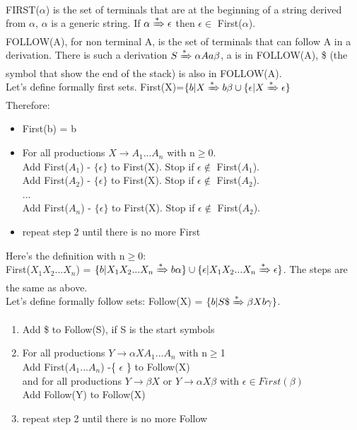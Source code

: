 \documentclass[12pt]{article}
\begin{document}
\\ FIRST($\alpha$) is the set of terminals that are at the beginning of a string derived from $\alpha$, $\alpha$ is a generic string. If $\alpha \xRightarrow[]{*} \epsilon$ then $\epsilon \in$ First($\alpha$).
\\ FOLLOW(A), for non terminal A, is the set of terminals that can follow A in a derivation. There is such a derivation $S \xRightarrow[]{*} \alpha A a \beta$, a is in FOLLOW(A), \$ (the symbol that show the end of the stack) is also in FOLLOW(A).
\vspace{2mm} 
\\ Let's define formally first sets. 
First(X)=$\{ b | X \xRightarrow[]{*} b\beta \cup \{ \epsilon | X \xRightarrow[]{*} \epsilon \}$
\\ Therefore: 
\begin{itemize}
    \item First(b) = { b }
    \item For all productions $X \rightarrow A_1 ... A_n$ with n$\geq$0.
        \\ Add First($A_1$) - $\{ \epsilon \}$ to First(X). Stop if $\epsilon \notin$ First($A_1$).
        \\ Add First($A_2$) - $\{ \epsilon \}$ to First(X). Stop if $\epsilon \notin$ First($A_2$).
        \\ ...
        \\ Add First($A_n$) - $\{ \epsilon \}$ to First(X). Stop if $\epsilon \notin$ First($A_2$).
    \item repeat step 2 until there is no more First
\end{itemize}
Here's the definition with n$\geq$0: 
\\ First($X_1X_2...X_n$) = $\{ b | X_1X_2...X_n \xRightarrow[]{*} b\alpha\} \cup \{ \epsilon | X_1X_2...X_n \xRightarrow[]{*} \epsilon\}$. The steps are the same as above.
\vspace{2mm}
\\ Let's define formally follow sets: Follow(X) = $\{ b | S\$ \xRightarrow[]{*} \beta X b \gamma \}$.
\begin{enumerate}
    \item Add \$ to Follow(S), if S is the start symbols
    \item For all productions $Y \rightarrow \alpha X A_1...A_n$ with n$\geq$1 
    \\ Add First($A_1...A_n$) -\{ $\epsilon$ \} to Follow(X)
    \\ and for all productions $Y \rightarrow \beta X$ or $Y \rightarrow \alpha X \beta$ with $\epsilon \in First(\beta)$ 
    \\ Add Follow(Y) to Follow(X)
    \item repeat step 2 until there is no more Follow
\end{enumerate}
\end{document}
